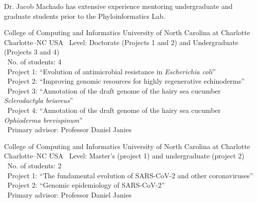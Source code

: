 \documentclass[11pt, letterpaper, sans]{moderncv}
\begin{document}

Dr. Jacob Machado has extensive experience mentoring undergraduate and graduate students prior to the Phyloinformatics Lab.

\vspace{.5em}

{College of Computing and Informatics}
{University of North Carolina at Charlotte}
{Charlotte--NC}
{USA}
{
	\textbullet~Level: Doctorate (Projects 1 and 2) and Undergraduate (Projects 3 and 4)\\
	\textbullet~No. of students: 4\\
	\textbullet~Project 1: ``Evolution of antimicrobial resistance in \textit{Escherichia coli}''\\
	\textbullet~Project 2: ``Improving genomic resources for highly regenerative echinoderms''\\
	\textbullet~Project 3: ``Annotation of the draft genome of the hairy sea cucumber \textit{Sclerodactyla briareus}''\\
	\textbullet~Project 4: ``Annotation of the draft genome of the hairy sea cucumber \textit{Ophioderma brevispinum}''\\
	\textbullet~Primary advisor: Professor Daniel Janies\\
}

{College of Computing and Informatics}
{University of North Carolina at Charlotte}
{Charlotte--NC}
{USA}
{
	\textbullet~Level: Master's (project 1) and undergraduate (project 2)\\
	\textbullet~No. of students: 2\\
	\textbullet~Project 1: ``The  fundamental evolution of SARS-CoV-2 and other coronaviruses''\\
	\textbullet~Project 2: ``Genomic epidemiology of SARS-CoV-2''\\
	\textbullet~Primary advisor: Professor Daniel Janies\\
}
\end{document}
